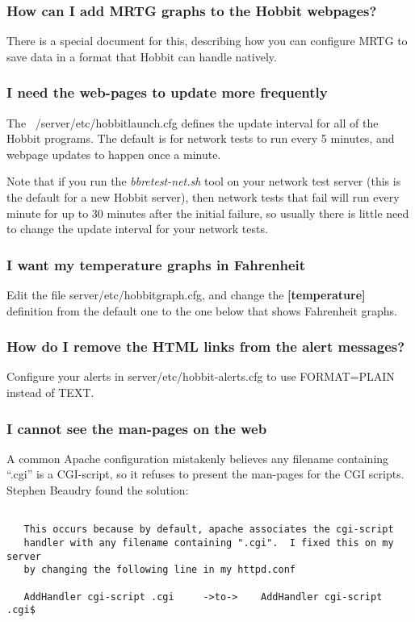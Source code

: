 \subsubsection{How can I add MRTG graphs to the Hobbit webpages?}


 There is a special document for this, describing how you can configure MRTG to save data in a format that Hobbit can handle natively.
 
\subsubsection{I need the web-pages to update more frequently}


 The ~/server/etc/hobbitlaunch.cfg defines the update interval for all of the Hobbit programs. The default is for network tests to run every 5 minutes, and webpage updates to happen once a minute.


 Note that if you run the \emph{bbretest-net.sh}
 tool on your network test server (this is the default for a new Hobbit server), then network tests that fail will run every minute for up to 30 minutes after the initial failure, so usually there is little need to change the update interval for your network tests.
 
\subsubsection{I want my temperature graphs in Fahrenheit}


 Edit the file server/etc/hobbitgraph.cfg, and change the \textbf{[temperature]}
 definition from the default one to the one below that shows Fahrenheit graphs.
 
\subsubsection{How do I remove the HTML links from the alert messages?}


 Configure your alerts in server/etc/hobbit-alerts.cfg to use FORMAT=PLAIN instead of TEXT.
 
\subsubsection{I cannot see the man-pages on the web}


 A common Apache configuration mistakenly believes any filename containing ``.cgi'' is a CGI-script, so it refuses to present the man-pages for the CGI scripts. Stephen Beaudry found the solution:
\begin{verbatim}

   This occurs because by default, apache associates the cgi-script
   handler with any filename containing ".cgi".  I fixed this on my server
   by changing the following line in my httpd.conf

   AddHandler cgi-script .cgi     ->to->    AddHandler cgi-script .cgi$

\end{verbatim}
 
